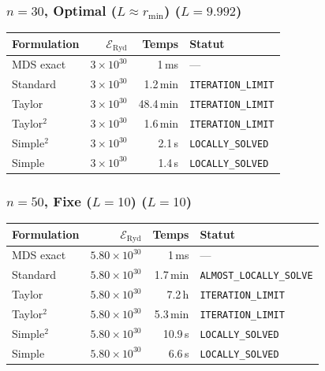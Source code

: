 \subsubsection{$n=30$, Optimal ($L{\approx}r_{\min}$) ($L=9.992$)}
\begin{longtable}{@{}lrrl@{}}
  \toprule
  Formulation & $\mathcal{E}_{\mathrm{Ryd}}$ & Temps & Statut \\
  \midrule
  \endhead
  MDS exact & $3\times10^{30}$ & 1\,ms & --- \\
  Standard & $3\times10^{30}$ & 1.2\,min & \texttt{ITERATION\_LIMIT} \\
  Taylor & $3\times10^{30}$ & 48.4\,min & \texttt{ITERATION\_LIMIT} \\
  Taylor$^2$ & $3\times10^{30}$ & 1.6\,min & \texttt{ITERATION\_LIMIT} \\
  Simple$^2$ & $3\times10^{30}$ & 2.1\,s & \texttt{LOCALLY\_SOLVED} \\
  Simple & $3\times10^{30}$ & 1.4\,s & \texttt{LOCALLY\_SOLVED} \\
  \bottomrule
\end{longtable}

\subsubsection{$n=50$, Fixe ($L{=}10$) ($L=10$)}
\begin{longtable}{@{}lrrl@{}}
  \toprule
  Formulation & $\mathcal{E}_{\mathrm{Ryd}}$ & Temps & Statut \\
  \midrule
  \endhead
  MDS exact & $5.80\times10^{30}$ & 1\,ms & --- \\
  Standard & $5.80\times10^{30}$ & 1.7\,min & \texttt{ALMOST\_LOCALLY\_SOLVE} \\
  Taylor & $5.80\times10^{30}$ & 7.2\,h & \texttt{ITERATION\_LIMIT} \\
  Taylor$^2$ & $5.80\times10^{30}$ & 5.3\,min & \texttt{ITERATION\_LIMIT} \\
  Simple$^2$ & $5.80\times10^{30}$ & 10.9\,s & \texttt{LOCALLY\_SOLVED} \\
  Simple & $5.80\times10^{30}$ & 6.6\,s & \texttt{LOCALLY\_SOLVED} \\
  \bottomrule
\end{longtable}

